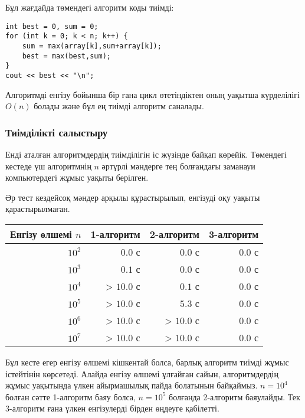 Бұл жағдайда төмендегі алгоритм коды тиімді:
\begin{lstlisting}
int best = 0, sum = 0;
for (int k = 0; k < n; k++) {
    sum = max(array[k],sum+array[k]);
    best = max(best,sum);
}
cout << best << "\n";
\end{lstlisting}

Алгоритмді енгізу бойынша бір ғана цикл өтетіндіктен оның уақытша күрделілігі 
$O(n)$ болады және бұл ең тиімді алгоритм саналады.

\subsubsection{Тиімділікті салыстыру}

Енді аталған алгоритмдердің тиімділігін іс жүзінде байқап көрейік.
Төмендегі кестеде үш алгоритмнің $n$ әртүрлі мәндерге тең болғандағы заманауи компьютердегі жұмыс уақыты берілген.

Әр тест кездейсоқ мәндер арқылы құрастырылып, енгізуді оқу уақыты қарастырылмаған.

\begin{center}
\begin{tabular}{rrrr}
Енгізу өлшемі $n$ & 1-алгоритм & 2-алгоритм & 3-алгоритм \\
\hline
$10^2$ & $0.0$ с & $0.0$ с & $0.0$ с \\
$10^3$ & $0.1$ с & $0.0$ с & $0.0$ с \\
$10^4$ & > $10.0$ с & $0.1$ с & $0.0$ с \\
$10^5$ & > $10.0$ с & $5.3$ с & $0.0$ с \\
$10^6$ & > $10.0$ с & > $10.0$ с & $0.0$ с \\
$10^7$ & > $10.0$ с & > $10.0$ с & $0.0$ с \\
\end{tabular}
\end{center}

Бұл кесте егер енгізу өлшемі кішкентай болса,
барлық алгоритм тиімді жұмыс істейтінін көрсетеді.
Алайда енгізу өлшемі ұлғайған сайын, алгоритмдердің жұмыс уақытында үлкен айырмашылық пайда болатынын байқаймыз.
$n=10^4$ болған сәтте 1-алгоритм баяу болса,
$n=10^5$ болғанда 2-алгоритм баяулайды.
Тек 3-алгоритм ғана үлкен енгізулерді бірден
өңдеуге қабілетті.
